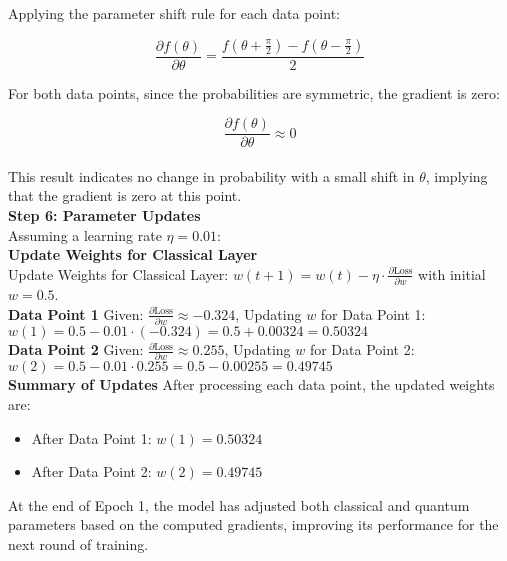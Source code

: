 \documentclass[a4paper]{article}
\begin{document}
Applying the parameter shift rule for each data point:

\[\frac{\partial f(\theta)}{\partial \theta} = \frac{f\left(\theta + \frac{\pi}{2}\right) - f\left(\theta - \frac{\pi}{2}\right)}{2}\]

For both data points, since the probabilities are symmetric, the gradient is zero:

\[\frac{\partial f(\theta)}{\partial \theta} \approx 0\]\\

\noindent This result indicates no change in probability with a small shift in \( \theta \), implying that the gradient is zero at this point.\\

\noindent \textbf{Step 6: Parameter Updates}\\

\noindent Assuming a learning rate \( \eta = 0.01 \): \\

\noindent \textbf{Update Weights for Classical Layer}\\

\noindent Update Weights for Classical Layer:  $ w(t + 1) = w(t) - \eta \cdot \frac{\partial \text{Loss}}{\partial w} $
with initial \( w = 0.5 \).\\

\noindent \textbf{Data Point 1}
Given: $\frac{\partial \text{Loss}}{\partial w} \approx -0.324 $, Updating \( w \) for Data Point 1: $w(1) = 0.5 - 0.01 \cdot (-0.324) = 0.5 + 0.00324 = 0.50324 $ \\

\noindent \textbf{Data Point 2}
Given: $ \frac{\partial \text{Loss}}{\partial w} \approx 0.255 $, Updating \( w \) for Data Point 2: $ w(2) = 0.5 - 0.01 \cdot 0.255 = 0.5 - 0.00255 = 0.49745 $ \\

\textbf{Summary of Updates}
After processing each data point, the updated weights are:
\begin{itemize}
	\item[] After Data Point 1: \( w(1) = 0.50324 \)
	\item[] After Data Point 2: \( w(2) = 0.49745 \)
\end{itemize}

\noindent At the end of Epoch 1, the model has adjusted both classical and quantum parameters based on the computed gradients, improving its performance for the next round of training.

\printglossary[type=\acronymtype, title=List of Abbreviations]
\end{document}
